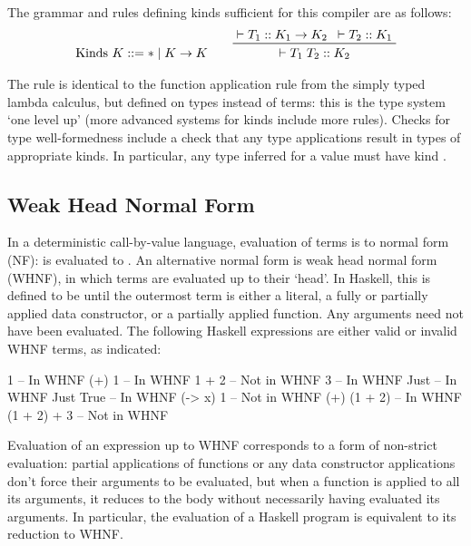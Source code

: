 \documentclass[dissertation.tex]{subfiles}
\begin{document}
{{        The grammar and rules defining kinds sufficient for this compiler are as follows:
        \begin{gather*}
        \text{Kinds } K ::= * \mid K \rightarrow K
        \qquad
        \prftree[r]{}
        {\vdash T_1 :: K_1 \rightarrow K_2}
        {\vdash T_2 :: K_1}
        {\vdash T_1\;T_2 :: K_2}
        \end{gather*}
        
        The rule is identical to the function application rule from the simply typed lambda calculus, but defined on types instead of terms: this is the type system `one level up' (more advanced systems for kinds include more rules). Checks for type well-formedness include a check that any type applications result in types of appropriate kinds. In particular, any type inferred for a value must have kind \haskell{*}.
    }
    \subsection{Weak Head Normal Form}\label{sec:whnf}
    {
        In a deterministic call-by-value language, evaluation of terms is to normal form (NF):  is evaluated to . An alternative normal form is weak head normal form (WHNF), in which terms are evaluated up to their `head'. In Haskell, this is defined to be until the outermost term is either a literal, a fully or partially applied data constructor, or a partially applied function. Any arguments need not have been evaluated. The following Haskell expressions are either valid or invalid WHNF terms, as indicated:

        \begin{haskellfigure}
        1               -- In WHNF
        (+) 1           -- In WHNF
        1 + 2           -- Not in WHNF
        3               -- In WHNF
        Just            -- In WHNF
        Just True       -- In WHNF
        (\x -> x) 1     -- Not in WHNF
        (+) (1 + 2)     -- In WHNF
        (1 + 2) + 3     -- Not in WHNF
        \end{haskellfigure}

        Evaluation of an expression up to WHNF corresponds to a form of non-strict evaluation: partial applications of functions or any data constructor applications don't force their arguments to be evaluated, but when a function is applied to all its arguments, it reduces to the body without necessarily having evaluated its arguments. In particular, the evaluation of a Haskell program is equivalent to its reduction to WHNF. 
    }
}
\end{document}
